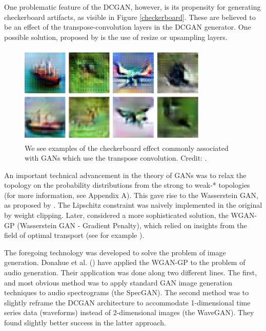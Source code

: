 One problematic feature of the DCGAN, however, is its propensity for generating checkerboard artifacts, as visible in Figure \ref{checkerboard}. These are believed to be an effect of the transpose-convolution layers in the DCGAN generator. One possible solution, proposed by \cite{Odena2016DeconvolutionAC} is the use of resize or upsampling layers.

\begin{figure}
\centering
\includegraphics[width=0.8\textwidth]{checkerboard.jpg}
\caption{We see examples of the checkerboard effect commonly associated with GANs which use the transpose convolution. Credit: \cite{Odena2016DeconvolutionAC}.}
\end{figure}\label{checkerboard}

An important technical advancement in the theory of GANs was to relax the topology on the probability distributions from the strong to weak-* topologies (for more information, see Appendix A). This gave rise to the Wasserstein GAN, as proposed by \cite{arjovsky2017wasserstein}. The Lipschitz constraint was naively implemented in the original by weight clipping. Later, \cite{gulrajani2017improved} considered a more sophisticated solution, the WGAN-GP (Wasserstein GAN - Gradient Penalty), which relied on insights from the field of optimal transport (see for example \cite{villani_2009}).

The foregoing technology was developed to solve the problem of image generation. Donahue et al. (\cite{donahue2018adversarial}) have applied the WGAN-GP to the problem of audio generation. Their application was done along two different lines. The first, and most obvious method was to apply standard GAN image generation techniques to audio spectrograms (the SpecGAN). The second method was to slightly reframe the DCGAN architecture to accommodate 1-dimensional time series data (waveforms) instead of 2-dimensional images (the WaveGAN). They found slightly better success in the latter approach.

